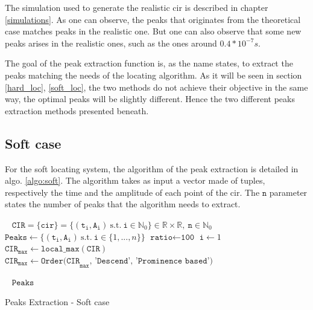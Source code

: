 The simulation used to generate the realistic \gls{cir} is described in chapter \ref{simulations}. As one can observe, the peaks that originates from the theoretical case matches peaks in the realistic one. But one can also observe that some new peaks arises in the realistic ones, such as the ones around $0.4*10^{-7}s$. 
\vspace{2mm}

The goal of the peak extraction function is, as the name states, to extract the peaks matching the needs of the locating algorithm. As it will be seen in section \ref{hard_loc}, \ref{soft_loc}, the two methods do not achieve their objective in the same way, the optimal peaks will be slightly different. Hence the two different peaks extraction methods presented beneath.

\subsection{Soft case}

For the soft locating system, the algorithm of the peak extraction is detailed in algo. \ref{algo:soft}. The algorithm takes as input a vector made of tuples, respectively the time and the amplitude of each point of the \gls{cir}. The $\texttt{n}$ parameter states the number of peaks that the algorithm needs to extract.
\vspace{2mm}


\begin{algorithm}[H]
 \KwInput{}\
 \hspace*{\algorithmicindent} $\mathtt{CIR} = \{\mathtt{cir}\} = \{ (\mathtt{t_i}, \mathtt{A_i}) ~\text{s.t.} ~\mathtt{i} \in \mathbb{N}_0\} \in \mathbb{R} \times \mathbb{R}, ~\mathtt{n} \in \mathbb{N}_0$ \;
\KwInit{}
\hspace*{\algorithmicindent} $\texttt{Peaks} \longleftarrow \{ (\mathtt{t_i}, \mathtt{A_i}) ~\text{s.t.} ~\mathtt{i} \in \{ 1, ..., n \} \}$\;
\hspace*{\algorithmicindent} $\texttt{ratio} \longleftarrow \texttt{100}$\;
\hspace*{\algorithmicindent} $\texttt{i} \longleftarrow 1$\;
\hspace*{\algorithmicindent} $\texttt{CIR}_\texttt{max} \longleftarrow \texttt{local\_max}(\texttt{CIR})$\;
\hspace*{\algorithmicindent} $\texttt{CIR}_\texttt{max} \longleftarrow \texttt{Order(CIR}_\texttt{max}\texttt{, 'Descend', 'Prominence based')}$\;


 \KwOutput{}\
 \hspace*{\algorithmicindent} $\texttt{Peaks}$\;
 \caption{Peaks Extraction - Soft case \label{algo:soft}}
\end{algorithm}
\vspace{2mm}

